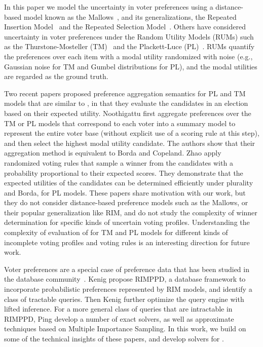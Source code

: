  In this paper we model the uncertainty in voter preferences using a distance-based model known as the Mallows~\cite{Mallows1957}, and its generalizations, the Repeated Insertion Model~\cite{Doignon2004} and the Repeated Selection Model~\cite{DBLP:journals/tdasci/ChakrabortyDKKR21}.
Others have considered uncertainty in voter preferences under the Random Utility Models (RUMs) such as the Thurstone-Mosteller (TM)~\cite{Thurstone1927-THUALO-2,RePEc:spr:psycho:v:16:y:1951:i:1:p:3-9} and the Plackett-Luce (PL)~\cite{plackett1975analysis,luce1959individual}.
RUMs quantify the preferences over each item with a modal utility randomized with noise (e.g., Gaussian noise for TM and Gumbel distributions for PL), and the modal utilities are regarded as the ground truth.

Two recent papers proposed preference aggregation semantics for PL and TM models that are similar to \mew, in that they evaluate the candidates in an election based on their expected utility. 
Noothigattu \etal \cite{DBLP:conf/aaai/NoothigattuGADR18} first aggregate  preferences over the TM or PL models that correspond to each voter into a summary model to represent the entire voter base (without explicit use of a scoring rule at this step), and then select the highest modal utility candidate.  The authors show that their aggregation method is equivalent to Borda and Copeland.
Zhao \etal \cite{DBLP:conf/uai/ZhaoLWKMSX18}  apply randomized voting rules that sample a winner from the candidates with a probability proportional to their expected scores.  They demonstrate that the expected utilities of the candidates  can be determined efficiently under plurality and Borda, for PL models.  These papers share motivation with our work, but they do not consider distance-based preference models such as the Mallows, or their popular generalization like RIM, and do not study the complexity of winner determination for specific kinds of uncertain voting profiles.  Understanding the complexity of evaluation of \mew for TM and PL models for different kinds of incomplete voting profiles and voting rules is an interesting direction for future work.

Voter preferences are a special case of preference data that has been studied in the database community~\cite{DBLP:journals/pvldb/JacobKS14}. Kenig \etal \cite{DBLP:conf/pods/KenigKPS17} propose RIMPPD, a database framework to incorporate probabilistic preferences represented by RIM models, and identify a class of tractable queries. Then Kenig \etal \cite{DBLP:conf/aaai/KenigIPKS18} further optimize the query engine with lifted inference. For a more general class of queries that are intractable in RIMPPD, Ping \etal \cite{DBLP:journals/pvldb/PingSK20} develop a number of exact solvers, as well as approximate techniques based on Multiple Importance Sampling.  In this work, we build on some of the technical insights of these papers, and develop solvers for \mew.
